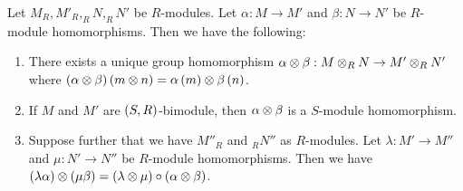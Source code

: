 \medskip

\begin{thm} 
    Let $M_R, M'_R, _RN, _RN'$ be $R$-modules. Let $\alpha: M\to M'$ and $\beta:N\to N'$ be $R$-module homomorphisms. Then we have the following:
    \begin{enumerate}
        \item There exists a unique group homomorphism $\alpha\otimes \beta: M\otimes_R N\to M' \otimes_R N'$ where $\left(\alpha\otimes \beta\right) \left(m\otimes n\right) = \alpha \left(m\right)\otimes \beta \left(n\right)$.
        \item If $M$ and $M'$ are $\left(S,R\right)$-bimodule, then $\alpha\otimes \beta$ is a $S$-module homomorphism.
        \item Suppose further that we have $M''_R$ and $_RN''$ as $R$-modules. Let $\lambda:M'\to M''$ and $\mu:N'\to N''$ be $R$-module homomorphisms. Then we have $(\lambda\alpha)\otimes(\mu\beta) = (\lambda\otimes \mu) \circ (\alpha\otimes \beta)$.
    \end{enumerate}
\end{thm}
